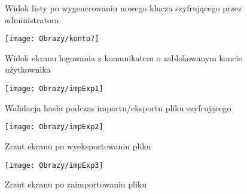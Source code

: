 \begin{enumerate*}
\begin{figure}[ht!]
\begin{minipage}{0.3\textwidth}
			\caption{Widok listy po wygenerowaniu nowego klucza szyfrującego przez administratora}
			\label{rys:zarzadzanieKontem6}
		\end{minipage}
		\hspace{0.05\textwidth}
		\begin{minipage}{0.3\textwidth}
		\texttt{[image: Obrazy/konto7]}
		\caption{Widok ekranu logowania z komunikatem o zablokowanym koncie użytkownika}
		\label{rys:zarzadzanieKontem7}
	\end{minipage}	
		\end{figure}
	\newpage
	\begin{figure}[ht!]
		\centering
		\begin{minipage}{0.25\textwidth}
			\vspace{0.3cm}
			\texttt{[image: Obrazy/impExp1]}
			\caption{Walidacja hasła podczas importu/eksportu pliku szyfrującego}
			\label{rys:impExp1}
		\end{minipage}
	\hspace{0.01\textwidth}
		\begin{minipage}{0.25\textwidth}
			\texttt{[image: Obrazy/impExp2]}
			\caption{Zrzut ekranu po wyeksportowaniu pliku }
			\label{rys:impExp2}
		\end{minipage}
		\hspace{0.01\textwidth}
		\begin{minipage}{0.25\textwidth}
			\texttt{[image: Obrazy/impExp3]}
			\caption{Zrzut ekranu po zaimportowaniu pliku }
			\label{rys:impExp3}
		\end{minipage}
	\end{figure}
\end{enumerate*}
